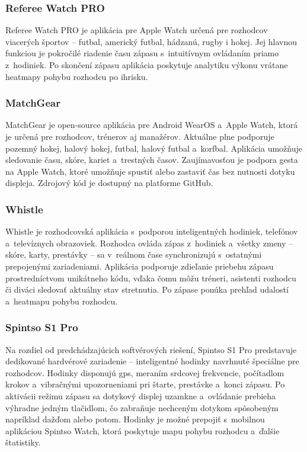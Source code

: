 \subsubsection{Referee Watch PRO}
Referee Watch PRO \cite{referee_watch_pro} je aplikácia pre Apple Watch určená pre
rozhodcov viacerých športov -- futbal, americký futbal, hádzanú,
rugby i hokej. Jej hlavnou funkciou je pokročilé riadenie času
zápasu s~intuitívnym ovládaním priamo z~hodiniek. Po skončení
zápasu aplikácia poskytuje analytiku výkonu vrátane heatmapy
pohybu rozhodcu po ihrisku.

\subsubsection{MatchGear}
MatchGear \cite{matchgear} je open-source aplikácia pre Android WearOS a~Apple
Watch, ktorá je určená pre rozhodcov, trénerov aj manažérov.
Aktuálne plne podporuje pozemný hokej, halový hokej, futbal,
halový futbal a~korfbal. Aplikácia umožňuje sledovanie času,
skóre, kariet a~trestných časov. Zaujímavosťou je podpora gesta
 na Apple Watch, ktoré umožňuje spustiť alebo
zastaviť čas bez nutnosti dotyku displeja. Zdrojový kód je
dostupný na platforme GitHub.

\subsubsection{Whistle}
Whistle \cite{whistle} je rozhodcovská aplikácia s~podporou inteligentných hodiniek,
telefónov a~televíznych obrazoviek. Rozhodca ovláda zápas
z~hodiniek a~všetky zmeny -- skóre, karty, prestávky -- sa
v~reálnom čase synchronizujú s~ostatnými prepojenými
zariadeniami. Aplikácia podporuje zdieľanie priebehu zápasu
prostredníctvom unikátneho kódu, vďaka čomu môžu tréneri,
asistenti rozhodcu či diváci sledovať aktuálny stav stretnutia.
Po zápase ponúka prehľad udalostí a~heatmapu pohybu rozhodcu.

\subsubsection{Spintso S1 Pro}
Na rozdiel od predchádzajúcich softvérových riešení, Spintso
S1 Pro \cite{spintso} predstavuje dedikované hardvérové zariadenie -- inteligentné
hodinky navrhnuté špeciálne pre rozhodcov. Hodinky disponujú
\Gls{gps}, meraním srdcovej frekvencie, počítadlom krokov
a~vibračnými upozorneniami pri štarte, prestávke a~konci
zápasu. Po aktivácii režimu zápasu sa dotykový displej uzamkne
a~ovládanie prebieha výhradne jedným tlačidlom, čo zabraňuje
nechceným dotykom spôsobeným napríklad dažďom alebo potom.
Hodinky je možné prepojiť s~mobilnou aplikáciou Spintso Watch,
ktorá poskytuje mapu pohybu rozhodcu a~ďalšie štatistiky.

